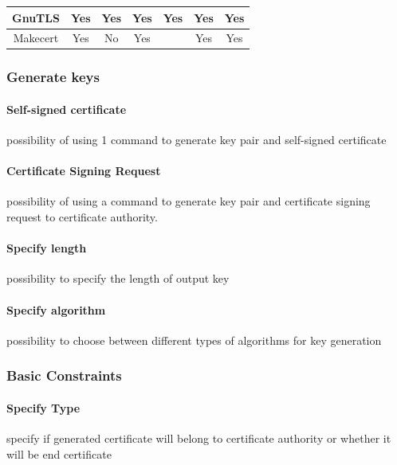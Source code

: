 \documentclass[10pt, a4paper]{report}
\begin{document}
\begin{table}[h!]
\begin{adjustbox}{max width=\textwidth}
\begin{tabular}{|c|c|c|c|c|c|c|}
GnuTLS                 & \cellcolor[HTML]{34FF34}Yes                                          & \cellcolor[HTML]{34FF34}Yes & \cellcolor[HTML]{34FF34}Yes & \cellcolor[HTML]{34FF34}Yes & \cellcolor[HTML]{34FF34}Yes & \cellcolor[HTML]{34FF34}Yes \\ \hline
Makecert               & \cellcolor[HTML]{34FF34}Yes					      & \cellcolor[HTML]{FE0000}No  & \cellcolor[HTML]{34FF34}Yes & \cellcolor[HTML]{FFFFFF}    & \cellcolor[HTML]{34FF34}Yes & \cellcolor[HTML]{34FF34}Yes \\ \hline
\end{tabular}
\end{adjustbox}
\end{table}

\subsubsection{Generate keys}

\paragraph{Self-signed certificate}
possibility of using 1 command to generate key pair and self-signed certificate

\paragraph{Certificate Signing Request}
possibility of using a command to generate key pair and certificate signing request to certificate authority.

\paragraph{Specify length}
possibility to specify the length of output key

\paragraph{Specify algorithm}
possibility to choose between different types of algorithms for key generation


\subsubsection{Basic Constraints}

\paragraph{Specify Type}
specify if generated certificate will belong to certificate authority or whether it will be end certificate
\end{document}

